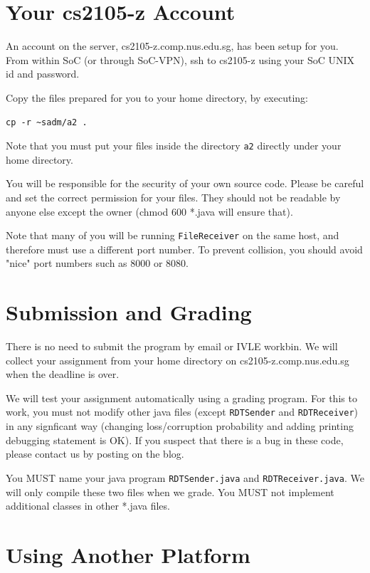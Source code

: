 \documentclass[a4paper,11pt]{exam}
\begin{document}
\section*{Your cs2105-z Account}

An account on the server, cs2105-z.comp.nus.edu.sg, has been setup for you. From within SoC (or through SoC-VPN), ssh to cs2105-z using your SoC UNIX id and password.

Copy the files prepared for you to your home directory, by executing:

\begin{verbatim}
cp -r ~sadm/a2 .
\end{verbatim}

Note that you must put your files inside the directory \texttt{a2} directly under your home directory. 

You will be responsible for the security of your own source code. Please be careful and set the correct permission for your files. They should not be readable by anyone else except the owner (chmod 600 *.java will ensure that).

Note that many of you will be running \texttt{FileReceiver} on the same host, and therefore must use a different port number. To prevent collision, you should avoid "nice" port numbers such as 8000 or 8080.

\section*{Submission and Grading}

There is no need to submit the program by email or IVLE workbin. We will collect your assignment from your home directory on cs2105-z.comp.nus.edu.sg when the deadline is over.

We will test your assignment automatically using a grading program. For this to work, you must not modify other java files (except \texttt{RDTSender} and \texttt{RDTReceiver}) in any signficant way (changing loss/corruption probability and adding printing debugging statement is OK).  If you suspect that there is a bug in these code, please contact us by posting on the blog.  

You MUST name your java program \texttt{RDTSender.java} and \texttt{RDTReceiver.java}.  We will only compile these two files when we grade. You MUST not implement additional classes in other *.java files.

\section*{Using Another Platform}
\end{document}
